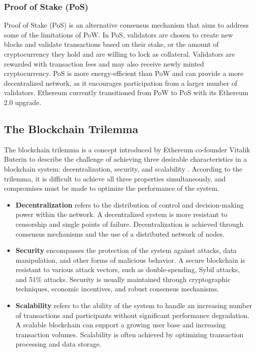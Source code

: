 \subsubsection{Proof of Stake (PoS)}
\label{sec:proof_of_stake}

Proof of Stake (PoS) is an alternative consensus mechanism that aims to address some of the limitations of PoW. In PoS, validators are chosen to create new blocks and validate transactions based on their stake, or the amount of cryptocurrency they hold and are willing to lock as collateral. Validators are rewarded with transaction fees and may also receive newly minted cryptocurrency. PoS is more energy-efficient than PoW and can provide a more decentralized network, as it encourages participation from a larger number of validators. Ethereum currently transitioned from PoW to PoS with its Ethereum 2.0 upgrade\cite{buterin2013ethereum}.

\subsection{The Blockchain Trilemma}
The blockchain trilemma is a concept introduced by Ethereum co-founder Vitalik Buterin to describe the challenge of achieving three desirable characteristics in a blockchain system: decentralization, security, and scalability \cite{buterin2016impossible}. According to the trilemma, it is difficult to achieve all three properties simultaneously, and compromises must be made to optimize the performance of the system.

\begin{itemize}
\item \textbf{Decentralization} refers to the distribution of control and decision-making power within the network. A decentralized system is more resistant to censorship and single points of failure. Decentralization is achieved through consensus mechanisms and the use of a distributed network of nodes.
\item \textbf{Security} encompasses the protection of the system against attacks, data manipulation, and other forms of malicious behavior. A secure blockchain is resistant to various attack vectors, such as double-spending, Sybil attacks, and 51\% attacks. Security is usually maintained through cryptographic techniques, economic incentives, and robust consensus mechanisms.

\item \textbf{Scalability} refers to the ability of the system to handle an increasing number of transactions and participants without significant performance degradation. A scalable blockchain can support a growing user base and increasing transaction volumes. Scalability is often achieved by optimizing transaction processing and data storage.
\end{itemize}

